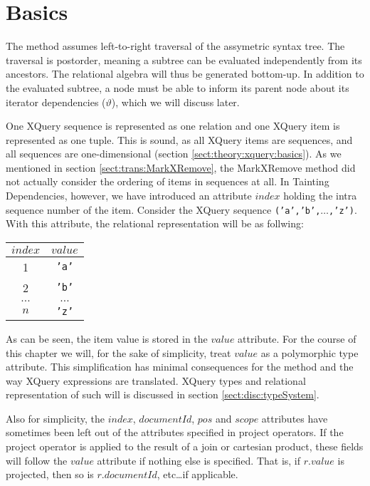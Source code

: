 \section{Basics}
\label{sect:trans:TD:basics}
The method assumes left-to-right traversal of the assymetric syntax tree. The traversal is
postorder, meaning a subtree can be evaluated independently from its ancestors. The relational algebra will thus
be generated bottom-up. In addition to the evaluated subtree, a node must be able to inform its parent node about
its iterator dependencies ($\vartheta$), which we will discuss later.

One XQuery sequence is represented as one relation and one XQuery item is represented as one tuple. This is sound,
as all XQuery items are sequences, and all sequences are one-dimensional (section
\ref{sect:theory:xquery:basics}). As we mentioned in section \ref{sect:trans:MarkXRemove}, the MarkXRemove method
did not actually consider the ordering of items in sequences at all. In Tainting Dependencies, however, we have
introduced an attribute $index$ holding the intra sequence number of the item. Consider the XQuery sequence
\texttt{('a','b',}$\ldots$\texttt{,'z')}. With this attribute, the relational representation will be as follwing:

\begin{center}
\begin{tabular}{|c|c|} \hline
$index$ & $value$ \\\hline
1		& \texttt{'a'} \\\hline
2		& \texttt{'b'} \\\hline
$\ldots$& $\ldots$ \\\hline
$n$		& \texttt{'z'} \\\hline
\end{tabular}
\end{center}


As can be seen, the item value is stored in the $value$ attribute. For the course of this chapter we will, for the
sake of simplicity, treat $value$ as a polymorphic type attribute. This simplification has minimal consequences
for the method and the way XQuery expressions are translated. XQuery types and relational representation of such
will is discussed in section \ref{sect:disc:typeSystem}.

Also for simplicity, the $index$, $documentId$, $pos$ and $scope$ attributes have sometimes been left out of the
attributes specified in \textsf{project} operators. If the \textsf{project} operator is applied to the result of a
join or cartesian product, these fields will follow the $value$ attribute if nothing else is specified. That is, if
$r.value$ is projected, then so is $r.documentId$, etc\ldots if applicable.

